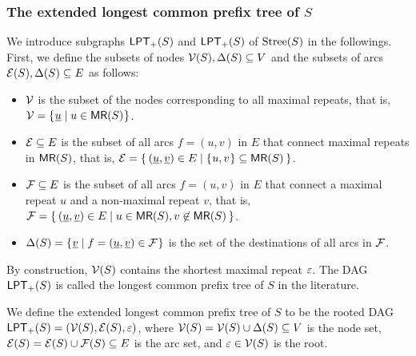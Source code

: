 \documentclass{article}
\begin{document}
\subsubsection{The extended longest common prefix tree of $S$}
We introduce subgraphs $\mathsf{LPT}_{+}(S)$ and $\mathsf{LPT}_{+}(S)$ of $\mathrm{Stree}(S)$ in the followings. First, we define the subsets of nodes $\mathcal{V}(S), \Delta(S) \subseteq V$ and the subsets  of arcs $\mathcal{E}(S), \Delta(S)\subseteq E$ as follows: 
\begin{itemize}
\item $\mathcal{V}$ is the subset of the nodes corresponding to all maximal repeats, that is, $\mathcal{V} = \{\kern0.05em \underline u \mid u \in \textsf{MR}(S) \kern0.05em\}$. 
  
\item $\mathcal{E} \subseteq E$ is the subset of all arcs $f = (u, v)$ in $E$ that connect maximal repeats in $\textsf{MR}(S)$, that is, $\mathcal{E} = \{\kern0.2em (\underline u, \underline v) \in E \mid \{\kern0.05emu, v\kern0.05em\} \subseteq \textsf{MR}(S) \kern0.2em\}$.

\item $\mathcal{F}\subseteq E$ is the subset of all arcs $f = (u, v)$ in $E$ that connect a maximal repeat $u$ and a non-maximal repeat $v$, that is, $\mathcal{F} = \{\kern0.2em (\underline u, \underline v) \in E \mid u \in \textsf{MR}(S), v \not\in \textsf{MR}(S) \kern0.2em\}$.  
  
\item $\Delta(S) = \{\kern0.05em \underline v \mid f = (\underline u, \underline v) \in \mathcal{F} \kern0.05em\}$ is the set of the destinations of all arcs in $\mathcal{F}$.
\end{itemize}

By construction,
$\mathcal{V}(S)$ contains the shortest maximal repeat $\varepsilon$. The DAG $\mathsf{LPT}_{+}(S)$ is called the longest common prefix tree of $S$ in the literature.  

\begin{definition}
  We define the extended longest common prefix tree of $S$ to be the rooted DAG $\mathsf{LPT}_{+}(S) = (\mathcal{V}(S), \mathcal{E}(S), \varepsilon)$, where 
  $\mathcal{V}(S) = \mathcal{V}(S) \cup \Delta(S) \subseteq V$ is the node set, $\mathcal{E}(S) = \mathcal{E}(S) \cup \mathcal{F}(S) \subseteq E$ is the arc set, and $\varepsilon \in \mathcal{V}(S)$ is the root. 
\end{definition}
\end{document}
